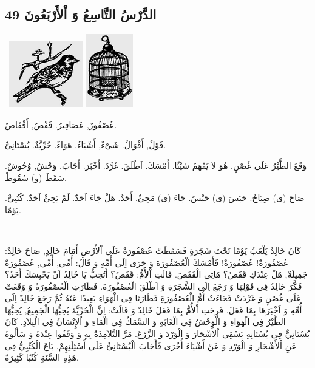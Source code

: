 \documentclass[a5paper]{article}
\begin{document}
\subsection[الدَّرْسُ التَّاسِعُ وَ اْلأَرْبَعُونَ 49]{الدَّرْسُ التَّاسِعُ وَ اْلأَرْبَعُونَ 49}
\  \includegraphics[width=1.2602in,height=1.1457in]{MuhammadBagauddinlatinized-img161.png}   \includegraphics[width=0.8126in,height=1.2602in]{MuhammadBagauddinlatinized-img162.png} 

عُصْفُورٌ, عَصَافِيرُ. قَفْصٌ, أَقْفَاصٌ. 

قَوْلٌ, أَقْوَالٌ. شَىْءٌ, أَشْيَاءُ. هَوَاءٌ. حُرِّيَّةٌ. بُسْتَانِىٌّ. 

وَقَعَ الطَّيْرُ عَلَى غُصْنٍ. هُوَ لاَ يَفْهَمُ شَيْئًا. أَمْسَكَ. اَطْلَقَ. غَرَّدَ. أَخْبَرَ. أَجَابَ. وَحْشٌ, وُحُوشٌ. سَقَطَ (و) سُقُوطٌ. 

صَاحَ (ى) صِيَاحٌ. حَبَسَ (ى) حَبْسٌ. جَاءَ (ى) مَجِئٌ. أَحَدٌ. هَلْ جَاءَ اَحَدٌ. لَمْ يَجِئْ اَحَدٌ. كُتُبِىٌّ. يَوْمًا.

\_\_\_\_\_\_\_\_\_\_\_\_\_\_\_\_\_\_\_\_\_\_\_\_\_\_\_\_\_\_\_

كَانَ خَالِدٌ يَلْعَبُ يَوْمًا تَحْتَ شَجَرَةٍ فَسَقَطَتْ عُصْفُورَةٌ عَلَى اْلأَرْضِ أَمَامَ خَالِدٍ, صَاحَ خَالِدٌ: عُصْفُورَةٌ! عُصْفُورَةٌ! فَأَمْسَكَ الْعُصْفُورَةَ وَ جَرَى اِلَى أُمِّهِ وَ قَالَ: أُمِّى, أُمِّى, عُصْفُورَةٌ جَمِيلَةٌ, هَلْ عِنْدَكِ قَفَصٌ؟ هَاتِى الْقَفَصَ. قَالَتِ اْلأُمُّ: قَفَصٌ؟ أَتُحِبُّ يَا خَالِدُ اَنْ يَحْبِسَكَ أَحَدٌ؟ فَكَّرَ خَالِدٌ فِى قَوْلِهَا وَ رَجَعَ اِلَى الشَّجَرَةِ وَ اَطْلَقَ الْعُصْفُورَةَ. فَطَارَتِ الْعُصْفُورَةُ وَ وَقَعَتْ عَلَى غُصْنٍ وَ غَرَّدَتْ فَجَاءَتْ أُمُّ الْعُصْفُورَةِ فَطَارَتَا فِى الْهَوَاءِ بَعِيدًا عَنْهُ ثُمَّ رَجَعَ خَالِدٌ اِلَى أُمِّهِ وَ اَخْبَرَهَا بِمَا فَعَلَ. فَرِحَتِ اْلأُمُّ بِمَا فَعَلَ خَالِدٌ وَ قَالَتْ: اِنَّ الْحُرِّيَّةَ يُحِبُّهَا الْجَمِيعُ, يُحِبُّهَا الطَّيْرُ فِى الْهَوَاءِ وَ الْوَحْشُ فِى الْغَابَةِ وَ السَّمَكُ فِى الْمَاءِ وَ اْلإِنْسَانُ فِى الْبِلاَدِ. كَانَ بُسْتَانِيٌّ فِى بُسْتَانِهِ يَسْقِى اْلأَشْجَارَ وَ الْوَرْدَ وَ الزَّرْعَ. مَرَّ التَّلاَمِذَةُ بِهِ وَ وَقَفُوا عِنْدَهُ وَ سَأَلُوهُ عَنِ اْلأَشْجَارِ وَ الْوَرْدِ وَ عَنْ أَشْيَاءَ أُخْرَى فَأَجَابَ الْبُسْتَانِىُّ عَلَى أَسْئِلَتِهِمْ. بَاعَ الْكُتُبِيُّ فِى هَذِهِ السَّنَةِ كُتُبًا كَثِيرَةً.
\end{document}

